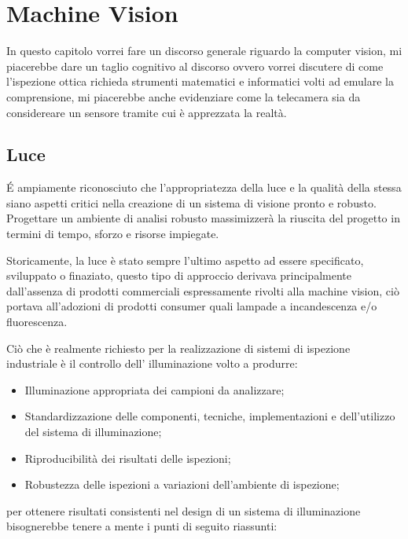 \chapter{Machine Vision}

In questo capitolo vorrei fare un discorso generale riguardo la computer vision,
mi piacerebbe dare un taglio cognitivo al discorso ovvero vorrei discutere di come
l'ispezione ottica richieda strumenti matematici e informatici volti ad emulare
la comprensione, mi piacerebbe anche evidenziare come la telecamera sia da considereare
un sensore tramite cui è apprezzata la realtà.

\section{Luce}

\'{E} ampiamente riconosciuto che l'appropriatezza della luce e la qualità della stessa
siano aspetti critici nella creazione di un sistema di visione pronto e robusto.
Progettare un ambiente di analisi robusto massimizzerà la riuscita del progetto in termini
di tempo, sforzo e risorse impiegate.

Storicamente, la luce è stato sempre l'ultimo aspetto ad essere specificato, sviluppato o finaziato, questo tipo di approccio derivava principalmente dall'assenza di prodotti commerciali espressamente rivolti alla machine vision, ciò portava all'adozioni di prodotti consumer quali lampade a incandescenza e/o fluorescenza.

Ciò che è realmente richiesto per la realizzazione di sistemi di ispezione industriale è il controllo dell' illuminazione volto a produrre:

\begin{itemize}
	\item Illuminazione appropriata dei campioni da analizzare;
	\item Standardizzazione delle componenti, tecniche, implementazioni e dell'utilizzo del sistema di illuminazione;
	\item Riproducibilità dei risultati delle ispezioni;
	\item Robustezza delle ispezioni a variazioni dell'ambiente di ispezione;
\end{itemize} 

per ottenere risultati consistenti nel design di un sistema di illuminazione bisognerebbe tenere a mente i punti di seguito riassunti:

